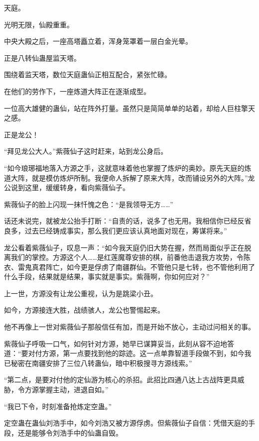 
\begin{this_body}

天庭。

光明无限，仙殿重重。

中央大殿之后，一座高塔矗立着，浑身笼罩着一层白金光晕。

正是八转仙蛊屋监天塔。

围绕着监天塔，数位天庭蛊仙正相互配合，紧张忙碌。

在他们的劳作下，一座炼道大阵正在逐渐成型。

一位高大雄健的蛊仙，站在阵外打量。虽然只是简简单单的站着，却给人巨柱擎天之感。

正是龙公！

“拜见龙公大人。”紫薇仙子这时赶来，站到龙公身后。

“如今琅琊福地落入方源之手，这就意味着他也掌握了炼炉的奥妙。原先天庭的炼道大阵，就是模仿炼炉所制。我便命人拆解了原来大阵，改而铺设另外的大阵。”龙公说到这里，缓缓转身，看向紫薇仙子。

紫薇仙子的脸上闪现一抹忏愧之色：“是我领导无方……”

话还未说完，就被龙公抬手打断：“自责的话，说多了也无用。我相信你已经反省良多，过去已经铸成事实，那么我们更应该认真地面对现在，筹谋将来。”

龙公看着紫薇仙子，叹息一声：“如今我天庭仍旧大势在握，然而局面似乎正在脱离我们的掌控。方源这个人……是红莲魔尊安排的棋，前番他击退我方攻势，令陈衣、雷鬼真君阵亡，如今更是俘虏了南疆群仙。不管他只是七转，也不管他利用了什么手段，结果就是结果，事实就是事实。紫薇啊，你如何应对？”

上一世，方源没有让龙公重视，认为是跳梁小丑。

如今，方源接连大胜，战绩骇人，龙公也警惕起来。

他不再像上一世对紫薇仙子那般信任有加，而是开始不放心，主动过问相关的事。

紫薇仙子呼吸一口气，如何针对方源，她早已谋算妥当，此刻从容不迫地答道：“要对付方源，第一点要找到他的踪迹。这一点单靠智道手段做不到，如今我已秘密在南疆安排了三位八转蛊仙，暗中积极搜寻方源线索。”

“第二点，是要对付他的定仙游为核心的杀招。此招比四通八达上古战阵更具威胁，令方源掌握主动，进退自如。”

“我已下令，时刻准备抢炼定空蛊。”

定空蛊在蛊仙刘浩手中，如今刘浩又被方源俘虏。但紫薇仙子自信：凭借天庭的手段，还是能够令刘浩手中的仙蛊自毁。


\end{this_body}
